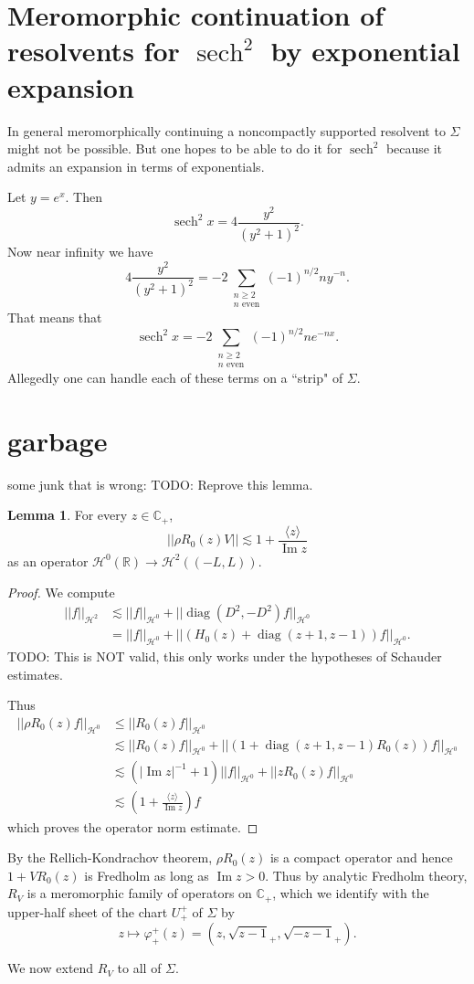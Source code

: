 \documentclass[12pt]{report}
\newcommand{\RR}{\mathbb{R}}
\newcommand{\CC}{\mathbb{C}}
\DeclareMathOperator{\sech}{sech}
\DeclareMathOperator{\diag}{diag}
\renewcommand{\Im}{\operatorname{Im}}
\theoremstyle{definition}
\newtheorem{lemma}[theorem]{Lemma}
\begin{document}
\section{Meromorphic continuation of resolvents for $\sech^2$ by exponential expansion}
In general meromorphically continuing a noncompactly supported resolvent to $\Sigma$ might not be possible. But one hopes to be able to do it for $\sech^2$ because it admits an expansion in terms of exponentials.

Let $y = e^x$. Then
$$\sech^2 x = 4\frac{y^2}{(y^2 + 1)^2}.$$
Now near infinity we have
$$4\frac{y^2}{(y^2 + 1)^2} = -2\sum_{\substack{n \geq 2\\n\text{ even}}}(-1)^{n/2} ny^{-n}.$$
That means that
$$\sech^2 x = -2\sum_{\substack{n \geq 2\\n\text{ even}}}(-1)^{n/2} ne^{-nx}.$$
Allegedly one can handle each of these terms on a ``strip" of $\Sigma$.

\section{garbage}


some junk that is wrong:
TODO: Reprove this lemma.
\begin{lemma}
For every $z \in \CC_+$,
$$||\rho R_0(z) V|| \lesssim 1 + \frac{\langle z \rangle}{\Im z}$$
as an operator $\mathcal H^0(\RR) \to \mathcal H^2((-L, L))$.
\end{lemma}
\begin{proof}
We compute
\begin{align*}
  ||f||_{\mathcal H^2} &\lesssim ||f||_{\mathcal H^0} + ||\diag(D^2, -D^2) f||_{\mathcal H^0}\\
  &= ||f||_{\mathcal H^0} + ||(H_0(z) + \diag(z + 1, z - 1))f||_{\mathcal H^0}.
\end{align*}
TODO: This is NOT valid, this only works under the hypotheses of Schauder estimates.

Thus
\begin{align*}||\rho R_0(z) f||_{\mathcal H^0} &\leq ||R_0(z) f||_{\mathcal H^0}\\
&\lesssim ||R_0(z)f||_{\mathcal H^0} + ||(1 + \diag(z + 1, z - 1)R_0(z))f||_{\mathcal H^0}\\
&\lesssim (|\Im z|^{-1} + 1)||f||_{\mathcal H^0} + ||zR_0(z)f||_{\mathcal H^0}\\
&\lesssim \left(1 + \frac{\langle z\rangle}{\Im z} \right)f
\end{align*}
which proves the operator norm estimate.
\end{proof}

By the Rellich-Kondrachov theorem, $\rho R_0(z)$ is a compact operator and hence $1 + VR_0(z)$ is Fredholm as long as $\Im z > 0$.
Thus by analytic Fredholm theory, $R_V$ is a meromorphic family of operators on $\CC_+$, which we identify with the upper-half sheet of the chart $U_+^+$ of $\Sigma$ by
$$z \mapsto \varphi_+^+(z) = (z, \sqrt{z-1}_+, \sqrt{-z-1}_+).$$

We now extend $R_V$ to all of $\Sigma$.




\newpage
\printindex
\end{document}
